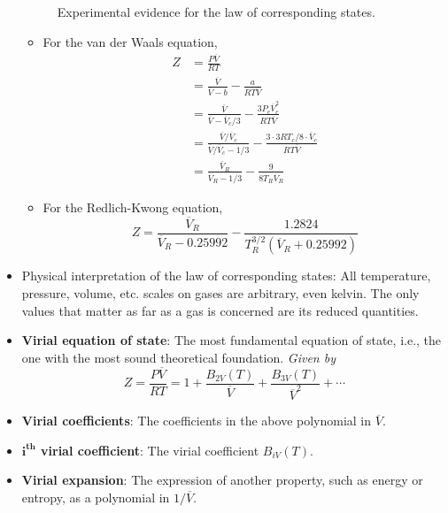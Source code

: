 \documentclass[../notes.tex]{subfiles}
\begin{document}
\begin{itemize}
\begin{figure}[h!]
        \caption{Experimental evidence for the law of corresponding states.}
        \label{fig:lawCorrespondingStates}
    \end{figure}
    \begin{itemize}
        \item For the van der Waals equation,
        \begin{align*}
            Z &= \frac{P\overline{V}}{RT}\\
            &= \frac{\overline{V}}{\overline{V}-b}-\frac{a}{RT\overline{V}}\\
            &= \frac{\overline{V}}{\overline{V}-\overline{V}_c/3}-\frac{3P_c\overline{V}_c^2}{RT\overline{V}}\\
            &= \frac{\overline{V}/\overline{V}_c}{\overline{V}/\overline{V}_c-1/3}-\frac{3\cdot 3RT_c/8\cdot\overline{V}_c}{RT\overline{V}}\\
            &= \frac{\overline{V}_R}{\overline{V}_R-1/3}-\frac{9}{8T_R\overline{V}_R}
        \end{align*}
        \item For the Redlich-Kwong equation,
        \begin{equation*}
            Z = \frac{\overline{V}_R}{\overline{V}_R-0.25992}-\frac{1.2824}{T_R^{3/2}(\overline{V}_R+0.25992)}
        \end{equation*}
    \end{itemize}
    \item Physical interpretation of the law of corresponding states: All temperature, pressure, volume, etc. scales on gases are arbitrary, even kelvin. The only values that matter as far as a gas is concerned are its reduced quantities.
    \item \textbf{Virial equation of state}: The most fundamental equation of state, i.e., the one with the most sound theoretical foundation. \emph{Given by}
    \begin{equation*}
        Z = \frac{P\overline{V}}{RT}
        = 1+\frac{B_{2V}(T)}{\overline{V}}+\frac{B_{3V}(T)}{\overline{V}^2}+\cdots
    \end{equation*}
    \item \textbf{Virial coefficients}: The coefficients in the above polynomial in $\overline{V}$.
    \item \textbf{$\bm{i^\textbf{th}}$ virial coefficient}: The virial coefficient $B_{iV}(T)$.
    \item \textbf{Virial expansion}: The expression of another property, such as energy or entropy, as a polynomial in $1/\overline{V}$.

\end{itemize}
\end{document}
